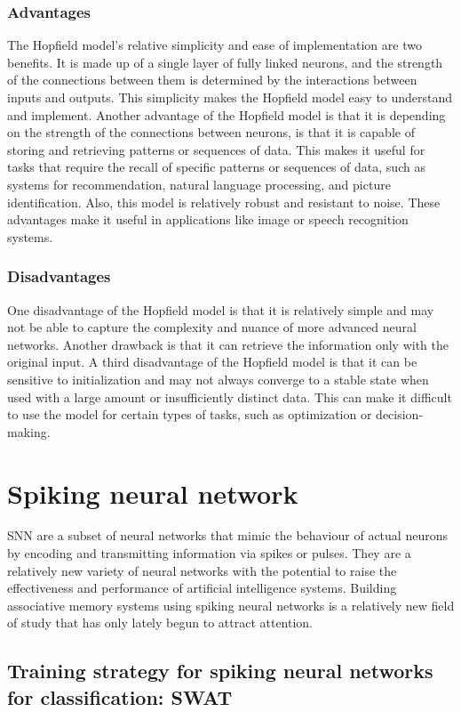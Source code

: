 \subsubsection{Advantages}
The Hopfield model's relative simplicity and ease of implementation are two
benefits. It is made up of a single layer of fully linked neurons, and the
strength of the connections between them is determined by the interactions
between inputs and outputs. This simplicity makes the Hopfield model easy to
understand and implement. Another advantage of the Hopfield model is that it is
depending on the strength of the connections between neurons, is that it is
capable of storing and retrieving patterns or sequences of data. This makes it
useful for tasks that require the recall of specific patterns or sequences of
data, such as systems for recommendation, natural language processing, and
picture identification. Also, this model is relatively robust and resistant to
noise. These advantages make it useful in applications like image or speech
recognition systems.
\subsubsection{Disadvantages}
One disadvantage of the Hopfield model is that it is relatively simple and may
not be able to capture the complexity and nuance of more advanced neural
networks. Another drawback is that it can retrieve the information only with
the original input. A third disadvantage of the Hopfield model is that it can
be sensitive to initialization and may not always converge to a stable state
when used with a large amount or insufficiently distinct data. This can make it
difficult to use the model for certain types of tasks, such as optimization or
decision-making.
\section{Spiking neural network}
SNN are a subset of neural networks that mimic the behaviour of actual neurons
by encoding and transmitting information via spikes or pulses. They are a
relatively new variety of neural networks with the potential to raise the
effectiveness and performance of artificial intelligence systems. Building
associative memory systems using spiking neural networks is a relatively new
field of study that has only lately begun to attract attention.

\subsection{Training strategy for spiking neural networks for classification: SWAT }
